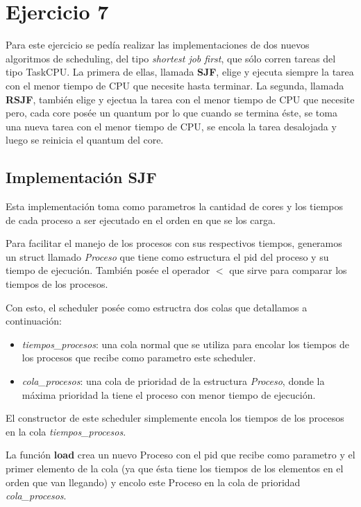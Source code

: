 \section{Ejercicio 7}

Para este ejercicio se pedía realizar las implementaciones de dos nuevos algoritmos de scheduling, del tipo \emph{shortest job first}, que sólo corren tareas del tipo TaskCPU.
La primera de ellas, llamada \textbf{SJF}, elige y ejecuta siempre la tarea con el menor tiempo de CPU que necesite hasta terminar.
La segunda, llamada \textbf{RSJF}, también elige y ejectua la tarea con el menor tiempo de CPU que necesite pero, cada core posée un quantum por lo que cuando se termina éste, se toma una nueva tarea con el menor tiempo de CPU, se encola la tarea desalojada y luego se reinicia el quantum del core.

\subsection{Implementación \textbf{SJF}}

Esta implementación toma como parametros la cantidad de cores y los tiempos de cada proceso a ser ejecutado en el orden en que se los carga.

Para facilitar el manejo de los procesos con sus respectivos tiempos, generamos un struct llamado \emph{Proceso} que tiene como estructura el pid del proceso y su tiempo de ejecución. También posée el operador $<$ que sirve para comparar los tiempos de los procesos.

Con esto, el scheduler posée como estructra dos colas que detallamos a continuación:

\begin{itemize}

\item \emph{tiempos\_procesos}: una cola normal que se utiliza para encolar los tiempos de los procesos que recibe como parametro este scheduler.

\item \emph{cola\_procesos}: una cola de prioridad de la estructura \emph{Proceso}, donde la máxima prioridad la tiene el proceso con menor tiempo de ejecución.

\end{itemize}

El constructor de este scheduler simplemente encola los tiempos de los procesos en la cola \emph{tiempos\_procesos}.

La función \textbf{load} crea un nuevo Proceso con el pid que recibe como parametro y el primer elemento de la cola (ya que ésta tiene los tiempos de los elementos en el orden que van llegando) y encolo este Proceso en la cola de prioridad \emph{cola\_procesos}.

